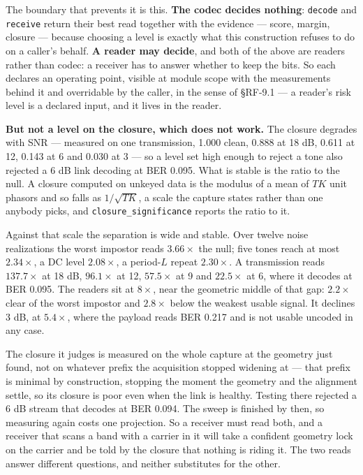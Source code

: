 \documentclass[10pt,letterpaper,twocolumn]{article}
\begin{document}
The boundary that prevents it is this. \textbf{The codec decides nothing}: \texttt{decode} and \texttt{receive} return their best read together with the evidence --- score, margin, closure --- because choosing a level is exactly what this construction refuses to do on a caller's behalf. \textbf{A reader may decide}, and both of the above are readers rather than codec: a receiver has to answer whether to keep the bits. So each declares an operating point, visible at module scope with the measurements behind it and overridable by the caller, in the sense of §RF-9.1 --- a reader's risk level is a declared input, and it lives in the reader.

\textbf{But not a level on the closure, which does not work.} The closure degrades with SNR --- measured on one transmission, 1.000 clean, 0.888 at 18 dB, 0.611 at 12, 0.143 at 6 and 0.030 at 3 --- so a level set high enough to reject a tone also rejected a 6 dB link decoding at BER 0.095. What is stable is the ratio to the null. A closure computed on unkeyed data is the modulus of a mean of \(TK\) unit phasors and so falls as \(1/\sqrt{TK}\), a scale the capture states rather than one anybody picks, and \texttt{closure\_\allowbreak{}significance} reports the ratio to it.

Against that scale the separation is wide and stable. Over twelve noise realizations the worst impostor reads \(3.66\times\) the null; five tones reach at most \(2.34\times\), a DC level \(2.08\times\), a period-\(L\) repeat \(2.30\times\). A transmission reads \(137.7\times\) at 18 dB, \(96.1\times\) at 12, \(57.5\times\) at 9 and \(22.5\times\) at 6, where it decodes at BER 0.095. The readers sit at \(8\times\), near the geometric middle of that gap: \(2.2\times\) clear of the worst impostor and \(2.8\times\) below the weakest usable signal. It declines 3 dB, at \(5.4\times\), where the payload reads BER 0.217 and is not usable uncoded in any case.

The closure it judges is measured on the whole capture at the geometry just found, not on whatever prefix the acquisition stopped widening at --- that prefix is minimal by construction, stopping the moment the geometry and the alignment settle, so its closure is poor even when the link is healthy. Testing there rejected a 6 dB stream that decodes at BER 0.094. The sweep is finished by then, so measuring again costs one projection. So a receiver must read both, and a receiver that scans a band with a carrier in it will take a confident geometry lock on the carrier and be told by the closure that nothing is riding it. The two reads answer different questions, and neither substitutes for the other.
\end{document}
